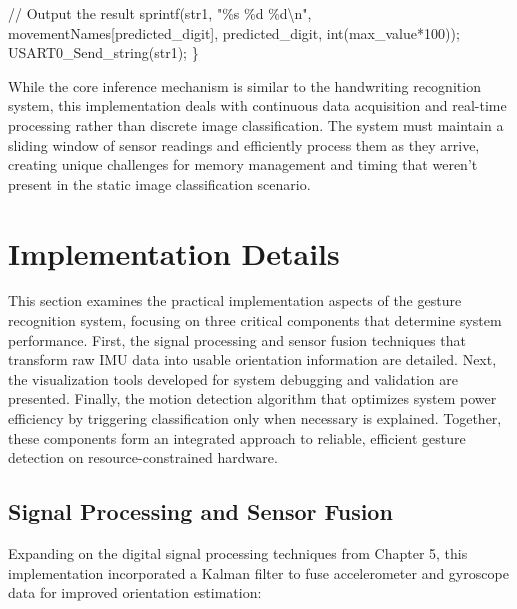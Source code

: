\documentclass[
  9pt,
  letterpaper,
  abstract,
  titlepage]{scrbook}
\newenvironment{Shaded}{\begin{snugshade}}{\end{snugshade}}
\newcommand{\CommentTok}[1]{\textcolor[rgb]{0.37,0.37,0.37}{#1}}
\newcommand{\DataTypeTok}[1]{\textcolor[rgb]{0.68,0.00,0.00}{#1}}
\newcommand{\DecValTok}[1]{\textcolor[rgb]{0.68,0.00,0.00}{#1}}
\newcommand{\NormalTok}[1]{\textcolor[rgb]{0.00,0.23,0.31}{#1}}
\newcommand{\OperatorTok}[1]{\textcolor[rgb]{0.37,0.37,0.37}{#1}}
\newcommand{\SpecialCharTok}[1]{\textcolor[rgb]{0.37,0.37,0.37}{#1}}
\newcommand{\StringTok}[1]{\textcolor[rgb]{0.13,0.47,0.30}{#1}}
\begin{document}
\begin{Shaded}
\begin{Highlighting}[]
  \CommentTok{// Output the result}
\NormalTok{  sprintf}\OperatorTok{(}\NormalTok{str1}\OperatorTok{,} \StringTok{"}\SpecialCharTok{\%s}\StringTok{ }\SpecialCharTok{\%d}\StringTok{ }\SpecialCharTok{\%d\textbackslash{}n}\StringTok{"}\OperatorTok{,}\NormalTok{ movementNames}\OperatorTok{[}\NormalTok{predicted\_digit}\OperatorTok{],}
\NormalTok{          predicted\_digit}\OperatorTok{,} \DataTypeTok{int}\OperatorTok{(}\NormalTok{max\_value}\OperatorTok{*}\DecValTok{100}\OperatorTok{));}
\NormalTok{  USART0\_Send\_string}\OperatorTok{(}\NormalTok{str1}\OperatorTok{);}
\OperatorTok{\}}
\end{Highlighting}
\end{Shaded}

While the core inference mechanism is similar to the handwriting
recognition system, this implementation deals with continuous data
acquisition and real-time processing rather than discrete image
classification. The system must maintain a sliding window of sensor
readings and efficiently process them as they arrive, creating unique
challenges for memory management and timing that weren't present in the
static image classification scenario.

\section{Implementation Details}\label{implementation-details-1}

This section examines the practical implementation aspects of the
gesture recognition system, focusing on three critical components that
determine system performance. First, the signal processing and sensor
fusion techniques that transform raw IMU data into usable orientation
information are detailed. Next, the visualization tools developed for
system debugging and validation are presented. Finally, the motion
detection algorithm that optimizes system power efficiency by triggering
classification only when necessary is explained. Together, these
components form an integrated approach to reliable, efficient gesture
detection on resource-constrained hardware.

\subsection{Signal Processing and Sensor
Fusion}\label{signal-processing-and-sensor-fusion}

Expanding on the digital signal processing techniques from Chapter 5,
this implementation incorporated a Kalman filter to fuse accelerometer
and gyroscope data for improved orientation estimation:
\end{document}
